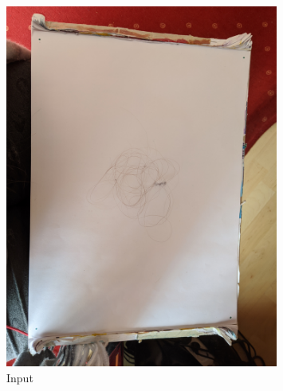 \documentclass[german,a4paper,12pt]{llncs}
\begin{document}
\begin{figure}[H]
	\centering
	\includegraphics[width=0.8\textwidth]{fig64/00IMG_20200406_153354_12_g_15.jpg}
	\caption[]{Input}
	\label{img:input}
\end{figure}
\end{document}
